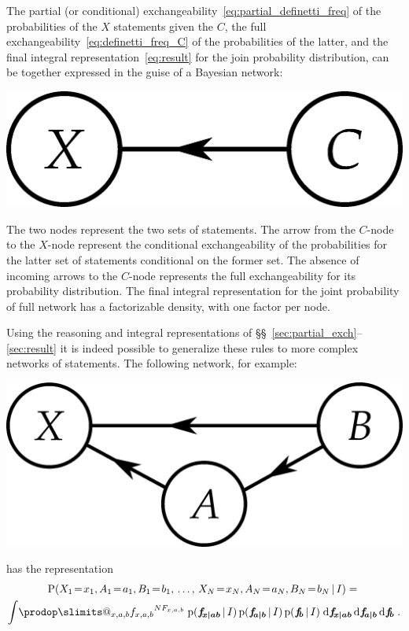 \documentclass[\ifafour a4paper,12pt,\else a5paper,10pt,\fi%
onecolumn,oneside,article,%
british%
]{memoir}
\makeatletter
\theoremstyle{remark}
\theoremstyle{innote}
\def\prod{\DOTSI\prodop\slimits@}
\newcommand*{\di}{\mathrm{d}}%
\newcommand*{\pf}{\mathrm{p}}%
\newcommand*{\p}{\mathrm{P}}%
\renewcommand*{\|}[1][]{\nonscript\,#1\vert\nonscript\,\mathopen{}}
\newcommand*{\sects}{\S\S}%
\renewcommand*{\=}{\TextOrMath\texteq\eq}
\newcommand*{\X}[1]{X_{#1}}
\newcommand*{\x}[1]{x_{#1}}
\newcommand*{\A}[1]{A_{#1}}
\newcommand*{\va}[1]{a_{#1}}
\newcommand*{\B}[1]{B_{#1}}
\newcommand*{\vb}[1]{b_{#1}}
\newcommand*{\ff}[1]{f_{#1}}
\newcommand*{\ffb}[1]{\bm{f_{\!#1}}}
\newcommand*{\FF}[1]{F_{#1}}
\newcommand*{\bcond}[1][]{\nonscript\,#1\bm{\vert}\nonscript\;\mathopen{}}
\makeatother
\begin{document}
The partial (or conditional)
exchangeability~\eqref{eq:partial_definetti_freq} of the probabilities of
the $X$ statements given the $C$, the full
exchangeability~\eqref{eq:definetti_freq_C} of the probabilities of the
latter, and the final integral representation~\eqref{eq:result} for the
join probability distribution, can be together expressed in the guise of a
Bayesian network:
\begin{center}%
\includegraphics[scale=0.5]{bayesnet1.png}
\end{center}%
The two nodes represent the two sets of statements. The arrow from the
$C$-node to the $X$-node represent the conditional exchangeability of the
probabilities for the latter set of statements conditional on the former
set. The absence of incoming arrows to the $C$-node represents the full
exchangeability for its probability distribution. The final integral
representation for the joint probability of full network has a factorizable
density, with one factor per node.

Using the reasoning and integral representations of
\sects~\ref{sec:partial_exch}--\ref{sec:result} it is indeed possible to
generalize these rules to more complex networks of statements. The
following network, for example:
\begin{center}%
\includegraphics[scale=0.5]{bayesnet3.png}
\end{center}%
has the representation
\begin{multline}
  \label{eq:example1}
  \p( \X{1}\=\x{1}, \A{1}\=\va{1}, \B{1}\=\vb{1},\, \dotsc,\,
   \X{N}\=\x{N}, \A{N}\=\va{N}, \B{N}\=\vb{N} \| I) ={}\\
\int\!\prod_{x,a,b} {\ff{x,a,b}}^{N \FF{x,a,b}}\;
\pf(\ffb{x \bcond ab}\|I)\,\pf(\ffb{a \bcond b}\|I)\,\pf(\ffb{b}\|I)
\;\di\ffb{x \bcond ab} \,\di\ffb{a \bcond b} \,\di\ffb{b} \;.
\end{multline}
\end{document}
